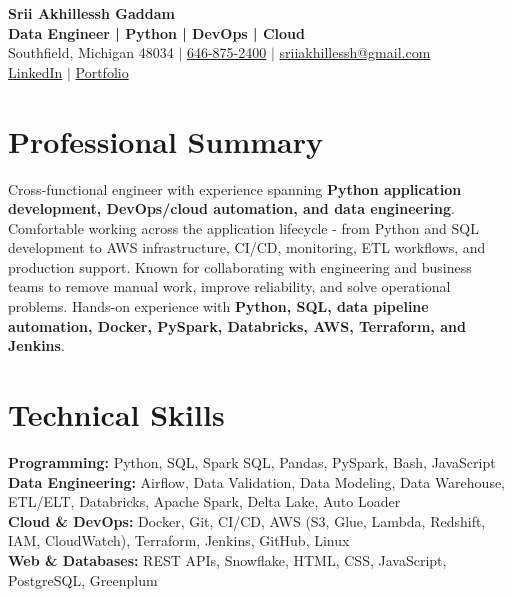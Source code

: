 \documentclass[letterpaper,10pt]{article}
\begin{document}
\fontsize{9.35pt}{10.45pt}\selectfont

\begin{center}
    {\LARGE \textbf{Srii Akhillessh Gaddam}} \\[-1pt]
    \textbf{Data Engineer | Python | DevOps | Cloud} \\[2pt]
    Southfield, Michigan 48034 $|$
    \href{tel:6468752400}{646-875-2400} $|$
    \href{mailto:sriiakhillessh@gmail.com}{sriiakhillessh@gmail.com} \\[1pt]
    \href{https://www.linkedin.com/in/srii-akhiilessh-gaddam-b48668191/}{LinkedIn} $|$
    \href{https://sriiakhillesshg.github.io/portfolio/}{Portfolio}
\end{center}
\vspace{-8pt}

\section{Professional Summary}
\small{Cross-functional engineer with experience spanning \textbf{Python application development, DevOps/cloud automation, and data engineering}. Comfortable working across the application lifecycle - from Python and SQL development to AWS infrastructure, CI/CD, monitoring, ETL workflows, and production support. Known for collaborating with engineering and business teams to remove manual work, improve reliability, and solve operational problems. Hands-on experience with \textbf{Python, SQL, data pipeline automation, Docker, PySpark, Databricks, AWS, Terraform, and Jenkins}.}

\section{Technical Skills}
\small{
\textbf{Programming:} Python, SQL, Spark SQL, Pandas, PySpark, Bash, JavaScript \\
\textbf{Data Engineering:} Airflow, Data Validation, Data Modeling, Data Warehouse, ETL/ELT, Databricks, Apache Spark, Delta Lake, Auto Loader \\
\textbf{Cloud \& DevOps:} Docker, Git, CI/CD, AWS (S3, Glue, Lambda, Redshift, IAM, CloudWatch), Terraform, Jenkins, GitHub, Linux \\
\textbf{Web \& Databases:} REST APIs, Snowflake, HTML, CSS, JavaScript, PostgreSQL, Greenplum
}
\end{document}
